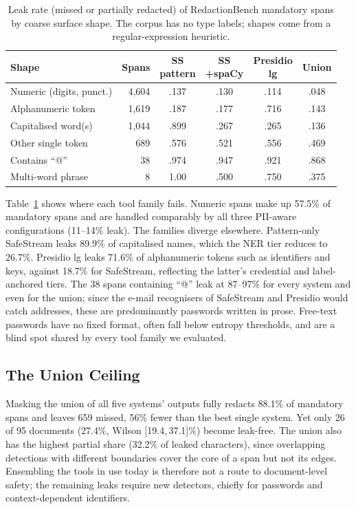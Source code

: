 \documentclass[conference]{IEEEtran}
\begin{document}
\begin{table}[t]
\centering
\caption{Leak rate (missed or partially redacted) of RedactionBench mandatory
spans by coarse surface shape. The corpus has no type labels; shapes come from
a regular-expression heuristic.}
\label{tab:shapes}
\setlength{\tabcolsep}{3.0pt}
\begin{tabular}{lrcccc}
\toprule
Shape & Spans & \shortstack{SS\\pattern} & \shortstack{SS\\+spaCy} & \shortstack{Presidio\\lg} & Union \\
\midrule
Numeric (digits, punct.) & 4{,}604 & .137 & .130 & .114 & .048 \\
Alphanumeric token       & 1{,}619 & .187 & .177 & .716 & .143 \\
Capitalised word(s)      & 1{,}044 & .899 & .267 & .265 & .136 \\
Other single token       & 689     & .576 & .521 & .556 & .469 \\
Contains ``@''           & 38      & .974 & .947 & .921 & .868 \\
Multi-word phrase        & 8       & 1.00 & .500 & .750 & .375 \\
\bottomrule
\end{tabular}
\end{table}

Table~\ref{tab:shapes} shows where each tool family fails. Numeric spans make
up 57.5\% of mandatory spans and are handled comparably by all three PII-aware
configurations (11--14\% leak). The families diverge elsewhere. Pattern-only
SafeStream leaks 89.9\% of capitalised names, which the NER tier reduces to
26.7\%. Presidio lg leaks 71.6\% of alphanumeric tokens such as identifiers and
keys, against 18.7\% for SafeStream, reflecting the latter's credential and
label-anchored tiers. The 38 spans containing ``@'' leak at 87--97\% for every
system and even for the union; since the e-mail recognisers of SafeStream and
Presidio would catch addresses, these are predominantly passwords written in
prose. Free-text passwords have no fixed
format, often fall below entropy thresholds, and are a blind spot shared by
every tool family we evaluated.

\subsection{The Union Ceiling}

Masking the union of all five systems' outputs fully redacts 88.1\% of
mandatory spans and leaves 659 missed, 56\% fewer than the best single system.
Yet only 26 of 95 documents (27.4\%, Wilson [19.4,\,37.1]\%) become leak-free.
The union also has the highest partial share (32.2\% of leaked characters),
since overlapping detections with different boundaries cover the core of a
span but not its edges. Ensembling the tools in use today is therefore not a
route to document-level safety; the remaining leaks require new detectors,
chiefly for passwords and context-dependent identifiers.
\end{document}
